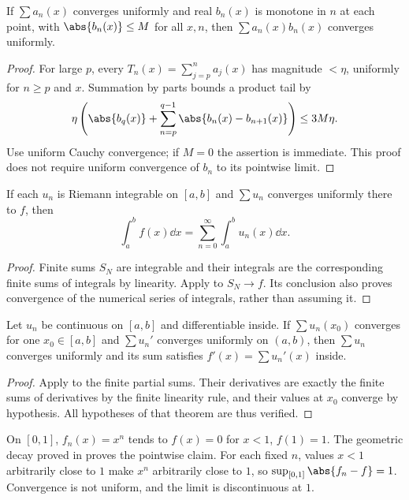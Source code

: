 \begin{theorem}
If $\sum a_n(x)$ converges uniformly and real $b_n(x)$ is monotone in $n$ at each point, with $\abs{b_n(x)}\leq M$ for all $x,n$, then $\sum a_n(x)b_n(x)$ converges uniformly.
\end{theorem}
\begin{proof}
For large $p$, every $T_n(x)=\sum_{j=p}^na_j(x)$ has magnitude $<\eta$, uniformly for $n\geq p$ and $x$. Summation by parts bounds a product tail by
\[\eta\left(\abs{b_q(x)}+\sum_{n=p}^{q-1}\abs{b_n(x)-b_{n+1}(x)}\right)\leq3M\eta.\]
Use uniform Cauchy convergence; if $M=0$ the assertion is immediate. This proof does not require uniform convergence of $b_n$ to its pointwise limit.
\end{proof}

\begin{theorem}
If each $u_n$ is Riemann integrable on $[a,b]$ and $\sum u_n$ converges uniformly there to $f$, then
\[\int_a^b f(x)\dd x=\sum_{n=0}^\infty\int_a^bu_n(x)\dd x.\]
\end{theorem}
\begin{proof}
Finite sums $S_N$ are integrable and their integrals are the corresponding finite sums of integrals by linearity. Apply  to $S_N\to f$. Its conclusion also proves convergence of the numerical series of integrals, rather than assuming it.
\end{proof}

\begin{theorem}
Let $u_n$ be continuous on $[a,b]$ and differentiable inside. If $\sum u_n(x_0)$ converges for one $x_0\in[a,b]$ and $\sum u_n'$ converges uniformly on $(a,b)$, then $\sum u_n$ converges uniformly and its sum satisfies $f'(x)=\sum u_n'(x)$ inside.
\end{theorem}
\begin{proof}
Apply  to the finite partial sums. Their derivatives are exactly the finite sums of derivatives by the finite linearity rule, and their values at $x_0$ converge by hypothesis. All hypotheses of that theorem are thus verified.
\end{proof}

\begin{example}
On $[0,1]$, $f_n(x)=x^n$ tends to $f(x)=0$ for $x<1$, $f(1)=1$. The geometric decay proved in  proves the pointwise claim. For each fixed $n$, values $x<1$ arbitrarily close to $1$ make $x^n$ arbitrarily close to $1$, so $\sup_{[0,1]}\abs{f_n-f}=1$. Convergence is not uniform, and the limit is discontinuous at $1$.
\end{example}

